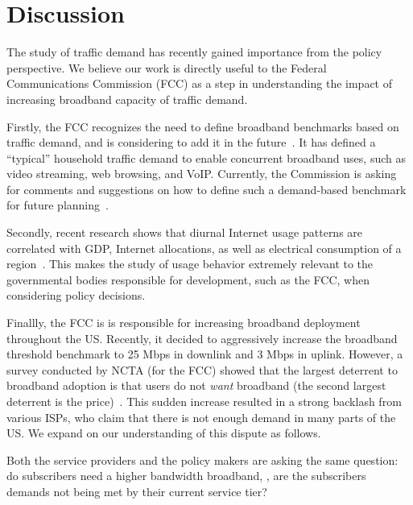 \section{Discussion}\label{sec:discussion}

The study of traffic demand has recently gained importance from the policy 
perspective. We believe our work is directly useful to the Federal 
Communications Commission (FCC) as a step in understanding the impact of 
increasing broadband capacity of traffic demand.

Firstly, the FCC recognizes the need to define broadband benchmarks based on 
traffic demand, and is considering to add it in the 
future~\cite{fcc2015broadband-report}. It has defined a ``typical'' household 
traffic demand to enable concurrent broadband uses, such as video streaming, web 
browsing, and VoIP. Currently, the Commission is asking for comments and 
suggestions on how to define such a demand-based benchmark for future 
planning~\cite{fcc2015progress-report, fcc2014progress-report}.

Secondly, recent research shows that diurnal Internet usage patterns are 
correlated with GDP, Internet allocations, as well as electrical consumption of 
a region~\cite{ant-diurnal-web}. This makes the study of usage behavior 
extremely relevant to the governmental bodies responsible for development, such 
as the FCC, when considering policy decisions.

Finallly, the FCC is is responsible for increasing broadband deployment 
throughout the US. Recently, it decided to aggressively increase the 
broadband threshold benchmark to 25 Mbps in downlink and 3 Mbps in uplink. 
However, a survey conducted 
by NCTA (for the FCC) showed that the largest deterrent to broadband adoption 
is that users do not \emph{want} broadband (the second largest deterrent is the 
price)~\cite{fcc2015progress-report}.  This sudden increase 
resulted in a strong backlash from various ISPs, who claim that 
there is not enough demand in many parts of the US. We expand on our 
understanding of this dispute as follows.

Both the service providers and the policy makers are asking the same
question: do subscribers need a higher bandwidth broadband, \ie, are the 
subscribers demands not being met by their current service tier?

